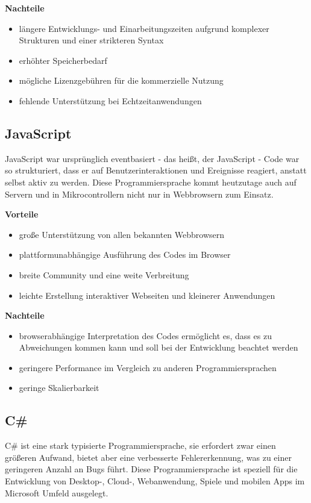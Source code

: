 \textbf{Nachteile}
\begin{itemize}
	\item längere Entwicklungs- und Einarbeitungszeiten aufgrund komplexer Strukturen und einer strikteren Syntax
	\item erhöhter Speicherbedarf
	\item mögliche Lizenzgebühren für die kommerzielle Nutzung
	\item fehlende Unterstützung bei Echtzeitanwendungen
\end{itemize}

\subsection{JavaScript}
JavaScript war ursprünglich eventbasiert - das heißt, der JavaScript - Code war so strukturiert, dass er auf Benutzerinteraktionen und Ereignisse reagiert, anstatt selbst aktiv zu werden. Diese Programmiersprache kommt heutzutage auch auf Servern und in Mikrocontrollern nicht nur in Webbrowsern zum Einsatz. \parencite{Programmiersprachen}

\textbf{Vorteile}
\begin{itemize}
	\item große Unterstützung von allen bekannten Webbrowsern
	\item plattformunabhängige Ausführung des Codes im Browser
	\item breite Community und eine weite Verbreitung
	\item leichte Erstellung interaktiver Webseiten und kleinerer Anwendungen
\end{itemize}

\textbf{Nachteile}
\begin{itemize}
	\item browserabhängige Interpretation des Codes ermöglicht es, dass es zu Abweichungen kommen kann und soll bei der Entwicklung beachtet werden
	\item geringere Performance im Vergleich zu anderen Programmiersprachen
	\item geringe Skalierbarkeit
\end{itemize}

\subsection{C\#}
C\# ist eine stark typisierte Programmiersprache, sie erfordert zwar einen größeren Aufwand, bietet aber eine verbesserte Fehlererkennung, was zu einer geringeren Anzahl an Bugs führt. Diese Programmiersprache ist speziell für die Entwicklung von Desktop-, Cloud-, Webanwendung, Spiele und mobilen Apps im Microsoft Umfeld ausgelegt. \parencite{Programmiersprachen}

